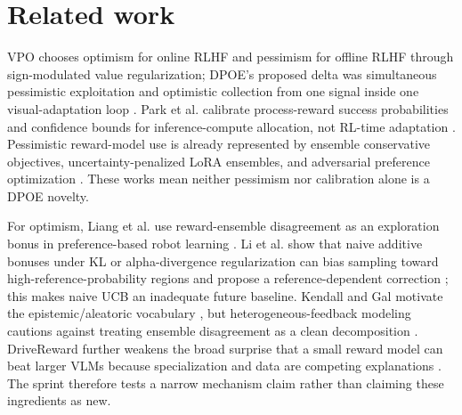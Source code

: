 \documentclass{article}
\begin{document}
\section{Related work}

VPO chooses optimism for online RLHF and pessimism for offline RLHF through sign-modulated value regularization; DPOE's proposed delta was simultaneous pessimistic exploitation and optimistic collection from one signal inside one visual-adaptation loop \citep{cen}. Park et al. calibrate process-reward success probabilities and confidence bounds for inference-compute allocation, not RL-time adaptation \citep{park}. Pessimistic reward-model use is already represented by ensemble conservative objectives, uncertainty-penalized LoRA ensembles, and adversarial preference optimization \citep{coste,zhai,kang}. These works mean neither pessimism nor calibration alone is a DPOE novelty.

For optimism, Liang et al. use reward-ensemble disagreement as an exploration bonus in preference-based robot learning \citep{liang}. Li et al. show that naive additive bonuses under KL or alpha-divergence regularization can bias sampling toward high-reference-probability regions and propose a reference-dependent correction \citep{li}; this makes naive UCB an inadequate future baseline. Kendall and Gal motivate the epistemic/aleatoric vocabulary \citep{kendall}, but heterogeneous-feedback modeling cautions against treating ensemble disagreement as a clean decomposition \citep{liu}. DriveReward further weakens the broad surprise that a small reward model can beat larger VLMs because specialization and data are competing explanations \citep{drivereward}. The sprint therefore tests a narrow mechanism claim rather than claiming these ingredients as new.
\end{document}
